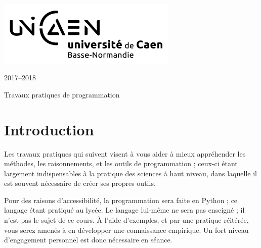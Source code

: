 \documentclass[a4paper,11pt]{article}
\begin{document}
%
\thispagestyle{empty}
\renewcommand{\headrulewidth}{0.0pt}
%

\setlength{\columnsep}{30pt}
\setlength{\columnseprule}{1pt}
\noindent
\begin{minipage}[t]{0.35\textwidth}
~\\[-2ex]
\includegraphics[scale=0.7]{unicaen_logo_rvb_noir_V1}

\end{minipage}
\begin{minipage}[t]{0.50\textwidth}
\end{minipage}
\begin{minipage}[t]{0.12\textwidth}
\flushleft
{
\footnotesize{2017--2018}}
\end{minipage}

\vspace{0.5cm}

\centerline{\sc\Large Travaux pratiques de programmation}
{\let\clearpage\relax \section*{Introduction}}
Les travaux pratiques qui suivent visent à vous aider à mieux appréhender
les méthodes, les raisonnements, et les outils de programmation ;
ceux-ci étant largement indispensables à la pratique des sciences à
haut niveau, dans laquelle il est souvent nécessaire
de créer ses propres outils.

Pour des raisons d'accessibilité, la programmation sera faite en Python ;
ce langage étant pratiqué au lycée. Le langage lui-même ne sera pas enseigné ;
il n'est pas le sujet de ce cours.
À l'aide d'exemples, et par une pratique réitérée,
vous serez amenés à en développer une connaissance empirique.
Un fort niveau d'engagement personnel est donc nécessaire en séance.
\end{document}
